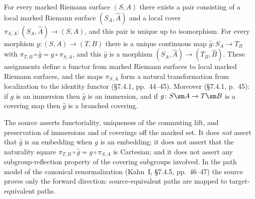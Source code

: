 \begin{theorem}\label{thm:kahn-localization}
For every marked Riemann surface \((S,A)\) there exists a pair
consisting of a local marked Riemann surface \((S_A,\widehat A)\) and
a local cover \(\pi_{S,A}\colon(S_A,\widehat A)\to(S,A)\), and this
pair is unique up to isomorphism.  For every morphism
\(g\colon(S,A)\to(T,B)\) there is a unique continuous map
\(\widehat g\colon S_A\to T_B\) with
\(\pi_{T,B}\circ\widehat g=g\circ\pi_{S,A}\), and this \(\widehat g\)
is a morphism \((S_A,\widehat A)\to(T_B,\widehat B)\).  These
assignments define a functor from marked Riemann surfaces to local
marked Riemann surfaces, and the maps \(\pi_{S,A}\) form a natural
transformation from localization to the identity functor
(\S7.4.1, pp.~44--45).  Moreover (\S7.4.1, p.~45): if \(g\) is an immersion
then \(\widehat g\) is an immersion, and if
\(g\colon S\sm A\to T\sm B\) is a covering map then \(\widehat g\) is
a branched covering.
\end{theorem}

\begin{remark}\label{rem:localization-nonassertions}
The source asserts functoriality, uniqueness of the commuting lift,
and preservation of immersions and of coverings off the marked set.
It does \emph{not} assert that \(\widehat g\) is an embedding when
\(g\) is an embedding; it does not assert that the naturality square
\(\pi_{T,B}\circ\widehat g=g\circ\pi_{S,A}\) is Cartesian; and it does
not assert any subgroup-reflection property of the covering subgroups
involved.  In the path model of the canonical renormalization
(Kahn~I, \S7.4.5, pp.~46--47) the source proves only the forward
direction: source-equivalent paths are mapped to target-equivalent
paths.
\end{remark}

